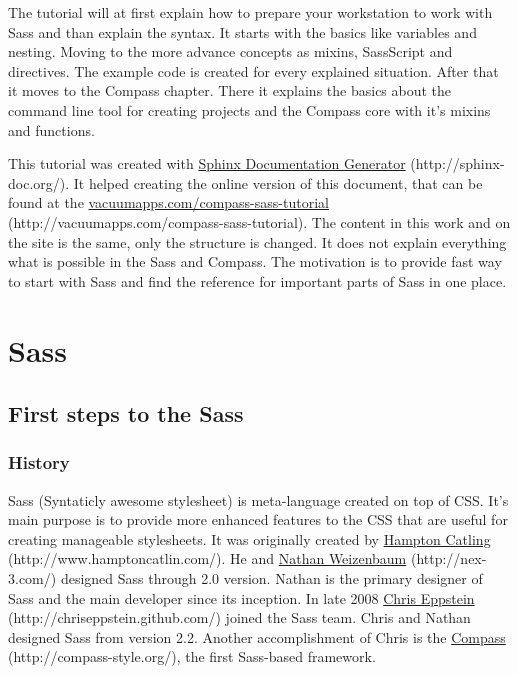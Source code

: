 \documentclass[a4paper,12pt,oneside,pdftex]{sphinxmanual}
\begin{document}
      The tutorial will at first explain how to prepare your workstation to work with Sass and than explain the syntax. It starts with the basics like variables and nesting. Moving to the more advance concepts as mixins, SassScript and directives. The example code is created for every explained situation. After that it moves to the Compass chapter. There it explains the basics about the command line tool for creating projects and the Compass core with it's mixins and functions.

      This tutorial was created with \href{http://sphinx-doc.org/}{Sphinx Documentation Generator} (http://sphinx-doc.org/). It helped creating the online version of this document, that can be found at the \href{http://vacuumapps.com/compass-sass-tutorial}{vacuumapps.com/compass-sass-tutorial} (http://vacuumapps.com/compass-sass-tutorial). The content in this work and on the site is the same, only the structure is changed. It does not explain everything what is possible in the Sass and Compass. The motivation is to provide fast way to start with Sass and find the reference for important parts of Sass in one place.

\chapter{Sass}
\label{src/sass:table-of-content}\label{src/sass::doc}\label{src/sass:sass}

\section{First steps to the Sass}
\label{src/sass:first-steps-to-the-sass}

\subsection{History}
\label{src/sass:history}
Sass (Syntaticly awesome stylesheet) is meta-language created on top of CSS. It's main purpose is to provide more enhanced features to the CSS that are useful for creating manageable stylesheets. It was originally created by \href{http://www.hamptoncatlin.com/}{Hampton Catling} (http://www.hamptoncatlin.com/). He and \href{http://nex-3.com/}{Nathan Weizenbaum} (http://nex-3.com/) designed Sass through 2.0 version. Nathan is the primary designer of Sass and the main developer since its inception. In late 2008 \href{http://chriseppstein.github.com/}{Chris Eppstein} (http://chriseppstein.github.com/) joined the Sass team. Chris and Nathan designed Sass from version 2.2. Another accomplishment of Chris is the \href{http://compass-style.org/}{Compass} (http://compass-style.org/), the first Sass-based framework.
\end{document}
